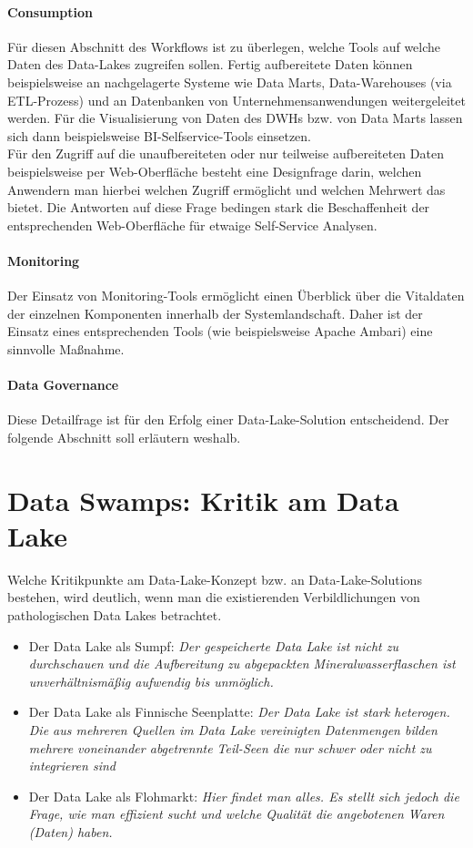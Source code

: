 \documentclass[twoside,twocolumn]{article}
\begin{document}
\paragraph{Consumption}
		Für diesen Abschnitt des Workflows ist zu überlegen, welche Tools auf welche Daten des Data-Lakes zugreifen sollen. Fertig aufbereitete Daten können beispielsweise an nachgelagerte Systeme wie Data Marts, Data-Warehouses (via ETL-Prozess) und an Datenbanken von Unternehmensanwendungen weitergeleitet werden. Für die Visualisierung von Daten des DWHs bzw. von Data Marts lassen sich dann beispielsweise BI-Selfservice-Tools einsetzen.\\
		Für den Zugriff auf die unaufbereiteten oder nur teilweise aufbereiteten Daten beispielsweise per Web-Oberfläche besteht eine Designfrage darin, welchen Anwendern man hierbei welchen Zugriff ermöglicht und welchen Mehrwert das bietet. Die Antworten auf diese Frage bedingen stark die Beschaffenheit der entsprechenden Web-Oberfläche für etwaige Self-Service Analysen.
		\cite{src8}\cite{src12}

\paragraph{Monitoring}
		Der Einsatz von Monitoring-Tools ermöglicht einen Überblick über die Vitaldaten der einzelnen Komponenten innerhalb der Systemlandschaft. Daher ist der Einsatz eines entsprechenden Tools (wie beispielsweise Apache Ambari) eine sinnvolle Maßnahme.\cite{src8}
		
\paragraph{Data Governance}
		Diese Detailfrage ist für den Erfolg einer Data-Lake-Solution entscheidend. Der folgende Abschnitt soll erläutern weshalb.


\section{Data Swamps: Kritik am Data Lake}
Welche Kritikpunkte am Data-Lake-Konzept bzw. an Data-Lake-Solutions bestehen, wird deutlich, wenn man die existierenden Verbildlichungen von pathologischen Data Lakes betrachtet.
\begin{itemize}
	\item Der Data Lake als Sumpf: \textit{Der gespeicherte Data Lake ist nicht zu durchschauen und die Aufbereitung zu abgepackten Mineralwasserflaschen ist unverhältnismäßig aufwendig bis unmöglich.\cite{src3}}
	\item Der Data Lake als Finnische Seenplatte:  \textit{Der Data Lake ist stark heterogen. Die aus mehreren Quellen im Data Lake vereinigten Datenmengen bilden mehrere voneinander abgetrennte Teil-Seen die nur schwer oder nicht zu integrieren sind\cite{src13}} 
	\item Der Data Lake als Flohmarkt: \textit{Hier findet man alles. Es stellt sich jedoch die Frage, wie man effizient sucht und welche Qualität die angebotenen Waren (Daten) haben.\cite{src12}} 
\end{itemize}
\end{document}
